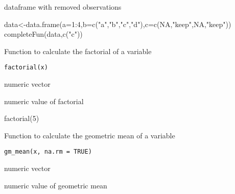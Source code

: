 \documentclass[a4paper]{book}
\begin{document}
%
\begin{Value}
dataframe with removed observations
\end{Value}
%
\begin{Examples}
\begin{ExampleCode}
data<-data.frame(a=1:4,b=c("a","b","c","d"),c=c(NA,"keep",NA,"keep"))
completeFun(data,c("c"))

\end{ExampleCode}
\end{Examples}
%
\begin{Description}\relax
Function to calculate the factorial of a variable
\end{Description}
%
\begin{Usage}
\begin{verbatim}
factorial(x)
\end{verbatim}
\end{Usage}
%
\begin{Arguments}
\begin{ldescription}
\item[\code{x}] numeric vector
\end{ldescription}
\end{Arguments}
%
\begin{Value}
numeric value of factorial
\end{Value}
%
\begin{Examples}
\begin{ExampleCode}
factorial(5)

\end{ExampleCode}
\end{Examples}
%
\begin{Description}\relax
Function to calculate the geometric mean of a variable
\end{Description}
%
\begin{Usage}
\begin{verbatim}
gm_mean(x, na.rm = TRUE)
\end{verbatim}
\end{Usage}
%
\begin{Arguments}
\begin{ldescription}
\item[\code{x}] numeric vector
\end{ldescription}
\end{Arguments}
%
\begin{Value}
numeric value of geometric mean
\end{Value}
\end{document}
